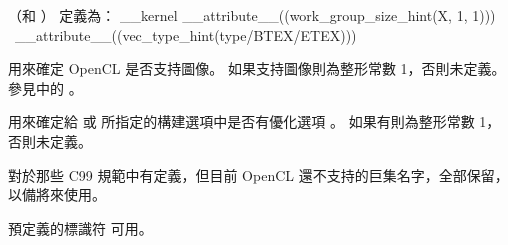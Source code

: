\ccmm{)}
（和 \ccmm{)}）
定義為：
\startclc
__kernel __attribute__((work_group_size_hint(X, 1, 1))) \
	 __attribute__((vec_type_hint(type/BTEX/ETEX)))
\stopclc

用來確定 OpenCL 是否支持圖像。
如果支持圖像則為整形常數 1，否則未定義。
參見中的 。

用來確定給  或 
 所指定的構建選項中是否有優化選項 。
如果有則為整形常數 1，否則未定義。

對於那些 C99 規範中有定義，但目前 OpenCL 還不支持的巨集名字，全部保留，以備將來使用。

預定義的標識符  可用。

